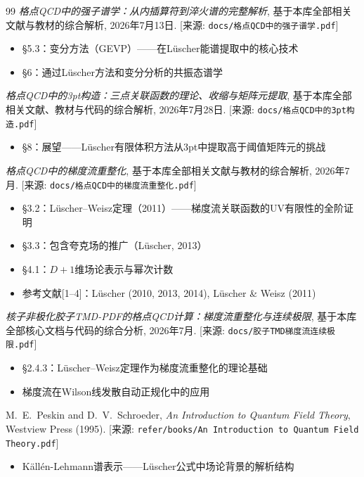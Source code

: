 \documentclass[12pt,a4paper]{ctexart}
\theoremstyle{definition}
\begin{document}
\begin{thebibliography}{99}
\textit{格点QCD中的强子谱学：从内插算符到淬火谱的完整解析},
基于本库全部相关文献与教材的综合解析, 2026年7月13日.
[来源: \texttt{docs/格点QCD中的强子谱学.pdf}]
\begin{itemize}
    \item §5.3：变分方法（GEVP）——在L\"uscher能谱提取中的核心技术
    \item §6：通过L\"uscher方法和变分分析的共振态谱学
\end{itemize}

\textit{格点QCD中的3pt构造：三点关联函数的理论、收缩与矩阵元提取},
基于本库全部相关文献、教材与代码的综合解析, 2026年7月28日.
[来源: \texttt{docs/格点QCD中的3pt构造.pdf}]
\begin{itemize}
    \item §8：展望——L\"uscher有限体积方法从3pt中提取高于阈值矩阵元的挑战
\end{itemize}

\textit{格点QCD中的梯度流重整化},
基于本库全部相关文献与教材的综合解析, 2026年7月.
[来源: \texttt{docs/格点QCD中的梯度流重整化.pdf}]
\begin{itemize}
    \item §3.2：L\"uscher--Weisz定理（2011）——梯度流关联函数的UV有限性的全阶证明
    \item §3.3：包含夸克场的推广（L\"uscher, 2013）
    \item §4.1：$D+1$维场论表示与幂次计数
    \item 参考文献[1--4]：L\"uscher (2010, 2013, 2014), L\"uscher \& Weisz (2011)
\end{itemize}

\textit{核子非极化胶子TMD-PDF的格点QCD计算：梯度流重整化与连续极限},
基于本库全部核心文档与代码的综合分析, 2026年7月.
[来源: \texttt{docs/胶子TMD梯度流连续极限.pdf}]
\begin{itemize}
    \item §2.4.3：L\"uscher--Weisz定理作为梯度流重整化的理论基础
    \item 梯度流在Wilson线发散自动正规化中的应用
\end{itemize}

M.~E.~Peskin and D.~V.~Schroeder,
\textit{An Introduction to Quantum Field Theory},
Westview Press (1995).
[来源: \texttt{refer/books/An Introduction to Quantum Field Theory.pdf}]
\begin{itemize}
    \item K\"all\'en-Lehmann谱表示——L\"uscher公式中场论背景的解析结构
\end{itemize}


\end{thebibliography}
\end{document}
